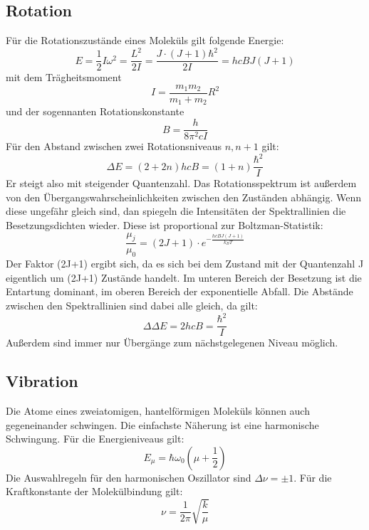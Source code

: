 \documentclass[11pt]{article}
\begin{document}
\subsection{Rotation}
Für die Rotationszustände eines Moleküls gilt folgende Energie:
\begin{equation}
  E=\frac{1}{2}I\omega^2=\frac{L^2}{2I}=\frac{J\cdot(J+1)\hbar^2}{2I}=hcBJ(J+1)
\end{equation}
mit dem Trägheitsmoment
\begin{equation}
  I=\frac{m_1m_2}{m_1+m_2}R^2
\end{equation}
und der sogennanten Rotationskonstante
\begin{equation}
  B=\frac{h}{8\pi^2cI}
\end{equation}
Für den Abstand zwischen zwei Rotationsniveaus $n, n+1$ gilt:
\begin{equation}
  \Delta E=(2+2n)hcB=(1+n)\frac{\hbar^2}{I}
\end{equation}
Er steigt also mit steigender Quantenzahl. Das Rotationsspektrum ist außerdem
von den Übergangswahrscheinlichkeiten zwischen den Zuständen abhängig. Wenn
diese ungefähr gleich sind, dan spiegeln die Intensitäten der Spektrallinien
die Besetzungsdichten wieder. Diese ist proportional zur Boltzman-Statistik:
\begin{equation}
  \frac{\mu_j}{\mu_0}=(2J+1)\cdot e^{-\frac{hcBJ(J+1)}{k_BT}}
\end{equation}
Der Faktor (2J+1) ergibt sich, da es sich bei dem Zustand mit der Quantenzahl J
eigentlich um (2J+1) Zustände handelt. Im unteren Bereich der Besetzung ist die
Entartung dominant, im oberen Bereich der exponentielle Abfall. Die Abstände
zwischen den Spektrallinien sind dabei alle gleich, da gilt:
\begin{equation}
  \Delta\Delta E=2hcB=\frac{\hbar^2}{I}
\end{equation}
Außerdem sind immer nur Übergänge zum nächstgelegenen Niveau möglich.

\subsection{Vibration}
Die Atome eines zweiatomigen, hantelförmigen Moleküls können auch gegeneinander
schwingen. Die einfachste Näherung ist eine harmonische Schwingung. Für die
Energieniveaus gilt:
\begin{equation}
  E_\mu=\hbar\omega_0\left(\mu+\frac{1}{2}\right)
\end{equation}
Die Auswahlregeln für den harmonischen Oszillator sind $\Delta\nu=\pm1$.
Für die Kraftkonstante der Molekülbindung gilt:
\begin{equation}
  \nu=\frac{1}{2\pi}\sqrt{\frac{k}{\mu}}
\end{equation}
\end{document}
